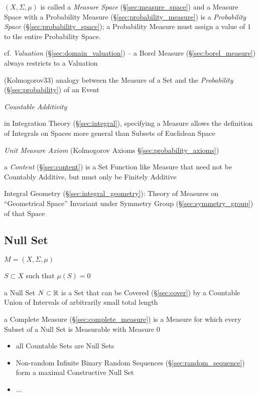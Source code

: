 $(X,\Sigma,\mu)$ is called a \emph{Measure Space} (\S\ref{sec:measure_space})
and a Measure Space with a Probability Measure
(\S\ref{sec:probability_measure}) is a \emph{Probability Space}
(\S\ref{sec:probability_space}); a Probability Measure must assign a value of
$1$ to the entire Probability Space.

\fist cf. \emph{Valuation} (\S\ref{sec:domain_valuation}) -- a Borel Measure
(\S\ref{sec:borel_measure}) always restricts to a Valuation

(Kolmogorov33) analogy between the Measure of a Set and the \emph{Probability}
(\S\ref{sec:probability}) of an Event

\emph{Countable Additivity}

in Integration Theory (\S\ref{sec:integral}), specifying a Measure allows the
definition of Integrals on Spaces more general than Subsets of Euclidean Space

\fist \emph{Unit Measure Axiom} (Kolmogorov Axioms
\S\ref{sec:probability_axioms})

\fist a \emph{Content} (\S\ref{sec:content}) is a Set Function like Measure that
need not be Countably Additive, but must only be Finitely Additive

\fist Integral Geometry (\S\ref{sec:integral_geometry}): Theory of Measures on
``Geometrical Space'' Invariant under Symmetry Group
(\S\ref{sec:symmetry_group}) of that Space



\subsection{Null Set}\label{sec:null_set}

$M = (X, \Sigma, \mu)$

$S \subset X$ such that $\mu(S) = 0$

a Null Set $N \subset \mathbb{R}$ is a Set that can be Covered (\S\ref{sec:cover})
by a Countable Union of Intervals of arbitrarily small total length

a Complete Measure (\S\ref{sec:complete_measure}) is a Measure for which every
Subset of a Null Set is Measurable with Measure $0$

\begin{itemize}
  \item all Countable Sets are Null Sets
  \item Non-random Infinite Binary Random Sequences
    (\S\ref{sec:random_sequence}) form a maximal Constructive Null Set
  \item ...
\end{itemize}



